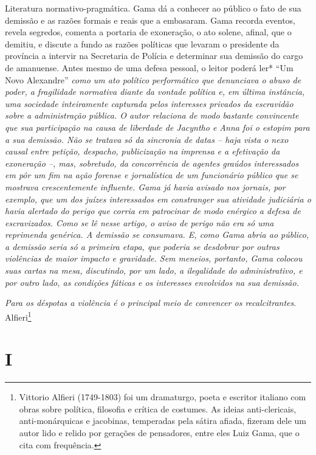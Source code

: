 \begin{didascalia}
Literatura normativo-pragmática. Gama dá a conhecer ao público o fato de
sua demissão e as razões formais e reais que a embasaram. Gama recorda
eventos, revela segredos, comenta a portaria de exoneração, o ato
solene, afinal, que o demitiu, e discute a fundo as razões políticas que
levaram o presidente da província a intervir na Secretaria de Polícia e
determinar sua demissão do cargo de amanuense. Antes mesmo de uma defesa
pessoal, o leitor poderá ler* ``Um Novo Alexandre'' \emph{como um ato
político performático que denunciava o abuso de poder, a fragilidade
normativa diante da vontade política e, em última instância, uma
sociedade inteiramente capturada pelos interesses privados da escravidão
sobre a administração pública. O autor relaciona de modo bastante
convincente que sua participação na causa de liberdade de Jacyntho e
Anna foi o estopim para a sua demissão. Não se tratava só da sincronia
de datas -- haja vista o nexo causal entre petição, despacho,
publicização na imprensa e a efetivação da exoneração --, mas,
sobretudo, da concorrência de agentes graúdos interessados em pôr um fim
na ação forense e jornalística de um funcionário público que se mostrava
crescentemente influente. Gama já havia avisado nos jornais, por
exemplo, que um dos juízes interessados em constranger sua atividade
judiciária o havia alertado do perigo que corria em patrocinar de modo
enérgico a defesa de escravizados. Como se lê nesse artigo, o aviso de
perigo não era só uma reprimenda genérica. A demissão se consumava. E,
como Gama abria ao público, a demissão seria só a primeira etapa, que
poderia se desdobrar por outras violências de maior impacto e gravidade.
Sem meneios, portanto, Gama colocou suas cartas na mesa, discutindo, por
um lado, a ilegalidade do administrativo, e por outro lado, as condições
fáticas e os interesses envolvidos na sua demissão.}
\end{didascalia}

\asterisc{}

\emph{Para os déspotas a violência é o principal meio de convencer os
recalcitrantes}. Alfieri\footnote{Vittorio Alfieri (1749-1803) foi um
  dramaturgo, poeta e escritor italiano com obras sobre política,
  filosofia e crítica de costumes. As ideias anti-clericais,
  anti-monárquicas e jacobinas, temperadas pela sátira afiada, fizeram
  dele um autor lido e relido por gerações de pensadores, entre eles
  Luiz Gama, que o cita com frequência.}

\section{I}


